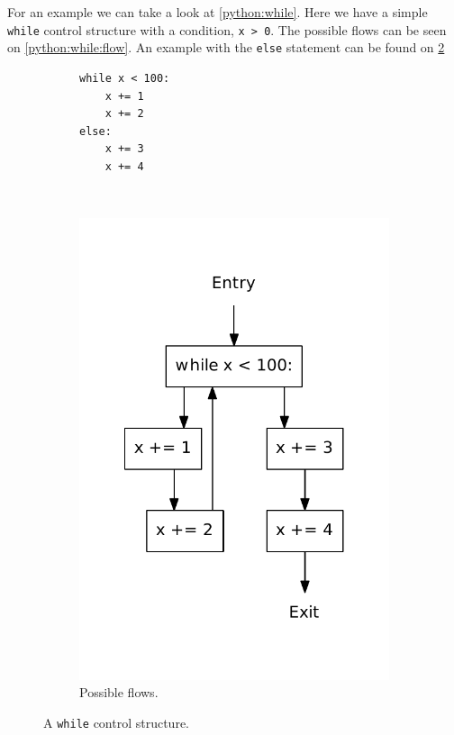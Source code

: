 For an example we can take a look at \cref{python:while}.
Here we have a simple \texttt{while} control structure with a condition, \texttt{x > 0}.
The possible flows can be seen on \cref{python:while:flow}.
An example with the \texttt{else} statement can be found on \cref{python:while:else}

\begin{figure}
  \centering
  \begin{subfigure}[b]{0.4\textwidth}
    \begin{lstlisting}[style=python, caption={Code example.}, label={python:while:else:code}]
while x < 100:
    x += 1
    x += 2
else:
    x += 3
    x += 4
    \end{lstlisting}
  \end{subfigure}
  ~ %
  \begin{subfigure}[b]{0.4\textwidth}
    \centering
    \includegraphics[scale=.5]{./figures/while_else.pdf}
    \caption{Possible flows.}
    \label{python:while:else:flow}
  \end{subfigure}
  \caption{A \texttt{while} control structure.}
  \label{python:while:else}
\end{figure}


